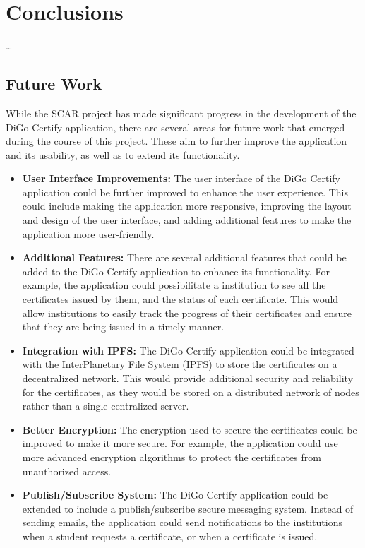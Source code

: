 %
%
%
\chapter{Conclusions}\label{chap:conclusions}

\dots

\section{Future Work}\label{sec:future-work}

While the SCAR project has made significant progress in the development of the DiGo Certify application, there are several areas for future work that emerged during the course of this project.
These aim to further improve the application and its usability, as well as to extend its functionality.

\begin{itemize}
    \item \textbf{User Interface Improvements:} The user interface of the DiGo Certify application could be further improved to enhance the user experience. This could include making the application more responsive, improving the layout and design of the user interface, and adding additional features to make the application more user-friendly.
    \item \textbf{Additional Features:} There are several additional features that could be added to the DiGo Certify application to enhance its functionality. For example, the application could possibilitate a institution to see all the certificates issued by them, and the status of each certificate. This would allow institutions to easily track the progress of their certificates and ensure that they are being issued in a timely manner.
    \item \textbf{Integration with IPFS:} The DiGo Certify application could be integrated with the InterPlanetary File System (IPFS) to store the certificates on a decentralized network. This would provide additional security and reliability for the certificates, as they would be stored on a distributed network of nodes rather than a single centralized server.
    \item \textbf{Better Encryption:} The encryption used to secure the certificates could be improved to make it more secure. For example, the application could use more advanced encryption algorithms to protect the certificates from unauthorized access.
    \item \textbf{Publish/Subscribe System:} The DiGo Certify application could be extended to include a publish/subscribe secure messaging system. Instead of sending emails, the application could send notifications to the institutions when a student requests a certificate, or when a certificate is issued.
\end{itemize}